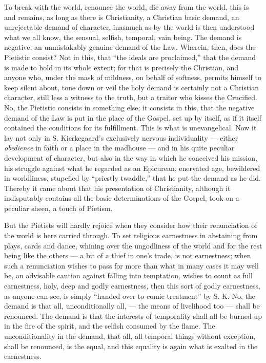 \documentclass[12pt,a4paper,openany]{book}
\newcommand{\opage}[1]{\marginnote{\footnotesize\textit{[#1]}}}
\begin{document}
To break with the world, renounce the world, die away from the world,
this is and remains, as long as there is Christianity,
a Christian basic demand, an unrejectable demand of character,
inasmuch as by the world is then understood what we all know,
the sensual, selfish, temporal, vain being. The demand
is negative, an unmistakably genuine demand of the Law.
Wherein, then, does the Pietistic consist? Not in this, that
``the ideals are proclaimed,'' that the demand is made to hold
in its whole extent; for that is precisely the Christian,
and anyone who, under the mask of mildness, on behalf of softness,
permits himself to keep silent about, tone down or veil
the holy demand is certainly not a Christian
character, still less a witness to the truth, but a
traitor who kisses the Crucified. No, the Pietistic
consists in something else; it consists in this, that
the negative demand of the Law is put in the place of the Gospel,
set up by itself, as if it itself contained the conditions
for its fulfillment. This is what is unevangelical.
Now it lay not only in S. Kierkegaard's exclusively
nervous individuality --- either \emph{obedience} in faith or a
place in the madhouse --- and in his quite peculiar
development of character, but also in the way in which he
conceived his mission, his struggle against what he regarded
as an Epicurean, enervated age, bewildered in worldliness, stupefied by
``priestly twaddle,'' that he put the demand as
\setcounter{footnote}{0}%
\opage{506}he did. Thereby it came about that his presentation of
Christianity, although it indisputably contains all the basic determinations of the Gospel,
took on a peculiar sheen, a touch of
Pietism.

But the Pietists will hardly rejoice when they consider
how their renunciation of the world is here carried through.
To set religious earnestness in abstaining from
plays, cards and dance, whining over the ungodliness of the world
and for the rest being like the others --- a bit of a thief in
one's trade, is not earnestness; when such a renunciation wishes
to pass for more than what in many cases it
may well be, an advisable caution against falling into temptation,
wishes to count as full earnestness, holy, deep and godly
earnestness, then this sort of godly earnestness, as anyone
can see, is simply ``handed over to comic treatment'' by S. K.
No, the demand is that all, unconditionally all, ---
the means of livelihood too --- shall be renounced. The demand is that
the interests of temporality shall all be burned up in the fire of the spirit,
and the selfish consumed by the flame. The unconditionality
in the demand, that all, all temporal things without exception,
shall be renounced, is the equal, and this equality is
again what is exalted in the earnestness.
\end{document}
